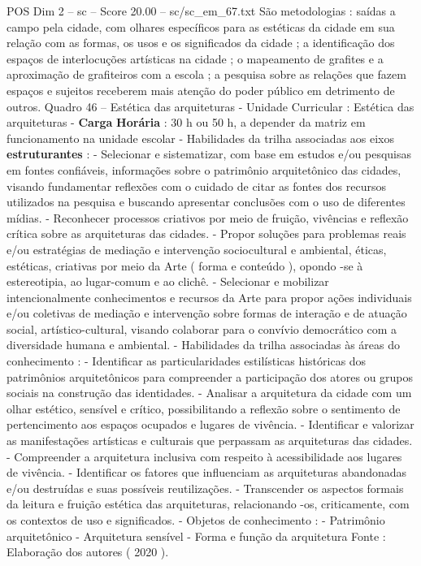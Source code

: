 \begin{textsample}{POS Dim 2 – sc – Score 20.00 – sc/sc\_em\_67.txt}
São metodologias : saídas a campo pela cidade, com olhares específicos para as estéticas da cidade em sua relação com as formas, os usos e os significados da cidade ; a identificação dos espaços de interlocuções artísticas na cidade ; o mapeamento de grafites e a aproximação de grafiteiros com a escola ; a pesquisa sobre as relações que fazem espaços e sujeitos receberem mais atenção do poder público em detrimento de outros.
Quadro 46 – Estética das arquiteturas - Unidade Curricular : Estética das arquiteturas - \textbf{Carga} \textbf{Horária} : 30 h ou 50 h, a depender da matriz em funcionamento na unidade escolar - Habilidades da trilha associadas aos eixos \textbf{estruturantes} : - Selecionar e sistematizar, com base em estudos e/ou pesquisas em fontes confiáveis, informações sobre o patrimônio arquitetônico das cidades, visando fundamentar reflexões com o cuidado de citar as fontes dos recursos utilizados na pesquisa e buscando apresentar conclusões com o uso de diferentes mídias. - Reconhecer processos criativos por meio de fruição, vivências e reflexão crítica sobre as arquiteturas das cidades. - Propor soluções para problemas reais e/ou estratégias de mediação e intervenção sociocultural e ambiental, éticas, estéticas, criativas por meio da Arte ( forma e conteúdo ), opondo -se à estereotipia, ao lugar-comum e ao clichê. - Selecionar e mobilizar intencionalmente conhecimentos e recursos da Arte para propor ações individuais e/ou coletivas de mediação e intervenção sobre formas de interação e de atuação social, artístico-cultural, visando colaborar para o convívio democrático com a diversidade humana e ambiental. - Habilidades da trilha associadas às áreas do conhecimento : - Identificar as particularidades estilísticas históricas dos patrimônios arquitetônicos para compreender a participação dos atores ou grupos sociais na construção das identidades. - Analisar a arquitetura da cidade com um olhar estético, sensível e crítico, possibilitando a reflexão sobre o sentimento de pertencimento aos espaços ocupados e lugares de vivência. - Identificar e valorizar as manifestações artísticas e culturais que perpassam as arquiteturas das cidades. - Compreender a arquitetura inclusiva com respeito à acessibilidade aos lugares de vivência. - Identificar os fatores que influenciam as arquiteturas abandonadas e/ou destruídas e suas possíveis reutilizações. - Transcender os aspectos formais da leitura e fruição estética das arquiteturas, relacionando -os, criticamente, com os contextos de uso e significados. - Objetos de conhecimento : - Patrimônio arquitetônico - Arquitetura sensível - Forma e função da arquitetura Fonte : Elaboração dos autores ( 2020 ).

\end{textsample}

